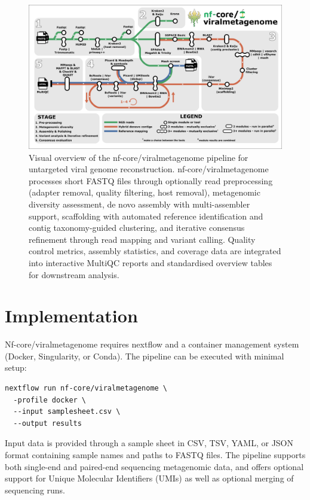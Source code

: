\begin{figure}[htbp]
    \centering
    \includegraphics[width=1\textwidth]{Fig/fig1.png}
    \caption{Visual overview of the nf-core/viralmetagenome pipeline for untargeted viral genome reconstruction. nf-core/viralmetagenome processes short FASTQ files through optionally read preprocessing (adapter removal, quality filtering, host removal), metagenomic diversity assessment, de novo assembly with multi-assembler support, scaffolding with automated reference identification and contig taxonomy-guided clustering, and iterative consensus refinement through read mapping and variant calling. Quality control metrics, assembly statistics, and coverage data are integrated into interactive MultiQC reports and standardised overview tables for downstream analysis.}
    \label{fig:pipeline-workflow}
\end{figure}

\section{Implementation}

Nf-core/viralmetagenome requires nextflow and a container management system (Docker, Singularity, or Conda). The pipeline can be executed with minimal setup:

\begin{verbatim}
nextflow run nf-core/viralmetagenome \
  -profile docker \
  --input samplesheet.csv \
  --output results
\end{verbatim}

Input data is provided through a sample sheet in CSV, TSV, YAML, or JSON format containing sample names and paths to FASTQ files. The pipeline supports both single-end and paired-end sequencing metagenomic data, and offers optional support for Unique Molecular Identifiers (UMIs) as well as optional merging of sequencing runs.

